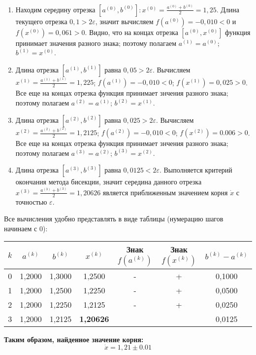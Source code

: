 \documentclass[a4paper,12pt]{article} %
\begin{document}
\begin{enumerate}
\begin{enumerate}
    \item Находим середину отрезка $[a^{(0)}, b^{(0)}]: x^{(0)} = \frac{a^{(0)} + b^{(0)}}{2} = 1,25$. Длина текущего отрезка $0,1 > 2\varepsilon$, значит вычисляем $f(a^{(0)}) = -0,010 < 0$ и $f(x^{(0)}) = 0,061 > 0$. Видно, что на концах отрезка $[a^{(0)}, x^{(0)}]$ функция принимает значения разного знака; поэтому полагаем $a^{(1)} = a^{(0)}$; $b^{(1)} = x^{(0)}$.
    \item Длина отрезка $[a^{(1)}, b^{(1)}]$ равна $0,05 > 2\varepsilon$. Вычисляем $x^{(1)} = \frac{a^{(1)} + b^{(1)}}{2} = 1,225$; $f(a^{(1)}) = -0,010 < 0$; $f(x^{(1)}) = 0,025 > 0$. Все еще на концах отрезка функция принимает знчения разного знака; поэтому полагаем $a^{(2)} = a^{(1)}$; $b^{(2)} = x^{(1)}$.
    \item Длина отрезка $[a^{(2)}, b^{(2)}]$ равна $0,025 > 2\varepsilon$. Вычисляем $x^{(2)} = \frac{a^{(2)} + b^{(2)}}{2} = 1,2125$; $f(a^{(2)}) = -0,010 < 0$; $f(x^{(2)}) = 0.006 > 0$. Все еще на концах отрезка функция принимает знчения разного знака; поэтому полагаем $a^{(3)} = a^{(2)}$; $b^{(3)} = x^{(2)}$.
    \item Длина отрезка $[a^{(3)}, b^{(3)}]$ равна $0,0125 < 2\varepsilon$. Выполняется критерий окончания метода бисекции, значит середина данного отрезка $x^{(3)} = \frac{a^{(3)} + b^{(3)}}{2} = 1,20626$ является приближенным значением корня $\dot x$ с точностью $\varepsilon$.
\end{enumerate}
\vspace{0.5cm}
Все вычисления удобно представлять в виде таблицы (нумерацию шагов начинаем с 0):

\begin{tabular}{ | c | c | c  | c | c | c | c | }
\hline
$k$ & $a^{(k)}$ & $b^{(k)}$ & $x^{(k)}$ & Знак $f(a^{(k)})$ & Знак $f(x^{(k)})$ & $b^{(k)} - a^{(k)}$\\ \hline 
0 & 1,2000 & 1,3000 & 1,2500 & - & + & 0,1000 \\ 
1 & 1,2000 & 1,2500 & 1,2250 & - & + & 0,0500 \\ 
2 & 1,2000 & 1,2250 & 1,2125 & - & + & 0,0250 \\
3 & 1,2000 & 1,2125 & \textbf{1,20626} &  &  & 0,0125 \\
\hline
\end{tabular}

\end{enumerate}
\vspace{1cm}

\begin{center}
\Large \textbf{Таким образом, найденное значение корня:} $$\dot x = 1,21 \pm 0.01$$
\end{center}
\end{document}
